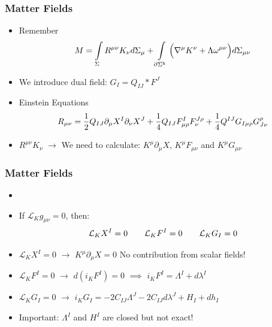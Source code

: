 \documentclass[t]{beamer}
\begin{document}

\begin{frame}
\frametitle{Matter Fields}

\begin{itemize}
\setlength{\parskip}{10pt}

\item<1-> Remember
\begin{align}
M = \int\limits_{\Sigma} R^{\mu\nu} K_\nu d\Sigma_{\mu} + \int\limits_{\partial\Sigma^{\text{h}}} \Big( \nabla^\mu K^{\nu} + \Lambda \omega^{\mu\nu} \Big) d\Sigma_{\mu\nu} \notag
\end{align}

\item<2-> We introduce dual field: $G_I = Q_{IJ} * F^J$

\item<3-> Einstein Equations
\begin{align}
R_{\mu\nu} = \frac{1}{2} Q_{IJ} \partial_{\mu} X^I \partial_{\nu} X^J + \frac{1}{4} Q_{IJ} F^I_{\mu\rho} F^{J\rho}_\nu + \frac{1}{4} Q^{IJ} G_{I\mu\rho} G^\rho_{J\nu} \notag
\end{align}

\item<4-> $R^{\mu\nu} K_\nu$ $\rightarrow$  We need to calculate: $K^\mu \partial_\mu X$, $K^\mu F_{\mu\nu}$ and $K^\mu G_{\mu\nu}$

\end{itemize}
\end{frame}



\begin{frame}
\frametitle{Matter Fields}

\begin{itemize}
\setlength{\parskip}{10pt}

\item<1-> 

\item<2-> If $\mathcal{L}_{K} g_{\mu\nu} = 0$, then:
\begin{align}
\mathcal{L}_{K} X^I = 0 \qquad \mathcal{L}_{K} F^I  = 0 \qquad \mathcal{L}_{K} G_I = 0 \notag
\end{align}

\item<3-> $\mathcal{L}_{K} X^I = 0$ $\rightarrow$ $\boxed{K^\mu \partial_\mu X = 0}$ \:\:\: No contribution from scalar fields!

\item<4-> $\mathcal{L}_{K} F^I  = 0$ $\rightarrow$ $d(i_{K} F^I) = 0$ $\implies$ $\boxed{i_{K} F^I = \Lambda^I + d\lambda^I}$

\item<5-> $\mathcal{L}_{K} G_I = 0$ $\rightarrow$ $\boxed{i_{K} G_I = -2C_{IJ} \Lambda^J - 2C_{IJ} d\lambda^J + H_{I} + dh_{I}}$

\item<6-> Important: $\Lambda^I$ and $H^I$ are closed but not exact!
\end{itemize}
\end{frame}
\end{document}
